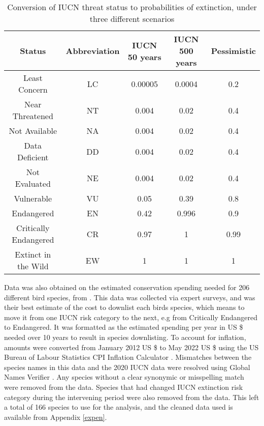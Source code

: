 \documentclass[10pt]{article}
\begin{document}
	\begin{table}[b]
		\begin{tabular}{|c|c c c c|}
			\hline
			Status & Abbreviation & IUCN 50 years & IUCN 500 years & Pessimistic \\
			\hline
			Least Concern & LC & 0.00005 & 0.0004 & 0.2 \\
			Near Threatened & NT & 0.004 & 0.02 & 0.4 \\
			Not Available & NA & 0.004 & 0.02 & 0.4 \\
			Data Deficient & DD & 0.004 & 0.02 & 0.4 \\
			Not Evaluated & NE & 0.004 & 0.02 & 0.4 \\
			Vulnerable & VU & 0.05 & 0.39 & 0.8 \\
			Endangered & EN & 0.42 & 0.996 & 0.9 \\
			Critically Endangered & CR & 0.97 & 1 & 0.99 \\
			Extinct in the Wild & EW & 1 & 1 & 1 \\
			\hline
		\end{tabular}
		\caption{Conversion of IUCN threat status to probabilities of extinction, under three
			different scenarios \cite{mooersConvertingEndangeredSpecies2008}}\label{ext_prob}
	\end{table}

	Data was also obtained on the estimated conservation spending needed for 206 different bird species, from \cite[McCarthy \textit{et al.} 2012]{mccarthyFinancialCostsMeeting2012}. This data was collected via expert surveys, and was their best estimate of the cost to downlist each birds species,
	which means to move it from one IUCN risk category to the next, e.g from Critically Endangered
	to Endangered. It was formatted as the estimated spending per year in US \$ needed over 10 years to result in species downlisting. To account for inflation, amounts were converted from January 2012
	US \$ to May 2022 US \$ using the US Bureau of Labour Statistics CPI Inflation Calculator
	\cite{} %
	. Mismatches between the species names in this data and the 2020 IUCN data were resolved using Global Names Verifier \cite{}. Any species without a clear synonymic or misspelling match were removed from the data. Species that had changed IUCN extinction risk category
	during the intervening period were also removed from the data. This left a total of 166 species to use for the analysis, and the cleaned data used is available from Appendix \ref{expen}.
	
\end{document}
